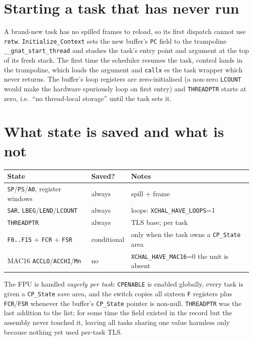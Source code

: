\section{Starting a task that has never run}

A brand-new task has no spilled frames to reload, so its first dispatch cannot use
\texttt{retw}. \texttt{Initialize\_Context} sets the new buffer's \texttt{PC} field
to the trampoline \texttt{\_\_gnat\_start\_thread} and stashes the task's entry
point and argument at the top of its fresh stack. The first time the scheduler
resumes the task, control lands in the trampoline, which loads the argument and
\texttt{callx} es the task wrapper \textemdash{} which never returns. The buffer's
loop registers are zero-initialised (a non-zero \texttt{LCOUNT} would make the
hardware spuriously loop on first entry) and \texttt{THREADPTR} starts at zero,
i.e.\ ``no thread-local storage'' until the task sets it.

\section{What state is saved \textemdash{} and what is not}

\begin{longtable}{p{5.5cm} p{2.2cm} p{5.5cm}}
\toprule
\textbf{State} & \textbf{Saved?} & \textbf{Notes} \\ \midrule
\endhead
\texttt{SP}/\texttt{PS}/\texttt{A0}, register windows & always & spill + frame \\
\texttt{SAR}, \texttt{LBEG}/\texttt{LEND}/\texttt{LCOUNT} & always & loops: \texttt{XCHAL\_HAVE\_LOOPS}=1 \\
\texttt{THREADPTR} & always & TLS base; per task \\
\texttt{F0..F15} + \texttt{FCR} + \texttt{FSR} & conditional & only when the task owns a \texttt{CP\_State} area \\
MAC16 \texttt{ACCLO}/\texttt{ACCHI}/\texttt{Mn} & no & \texttt{XCHAL\_HAVE\_MAC16}=0 \textemdash{} the unit is absent \\
\bottomrule
\end{longtable}

The FPU is handled \emph{eagerly per task}: \texttt{CPENABLE} is enabled globally,
every task is given a \texttt{CP\_State} save area, and the switch copies all
sixteen \texttt{F} registers plus \texttt{FCR}/\texttt{FSR} whenever the buffer's
\texttt{CP\_State} pointer is non-null. \texttt{THREADPTR} was the last addition to
the list; for some time the field existed in the record but the assembly never
touched it, leaving all tasks sharing one value \textemdash{} harmless only because
nothing yet used per-task TLS.

